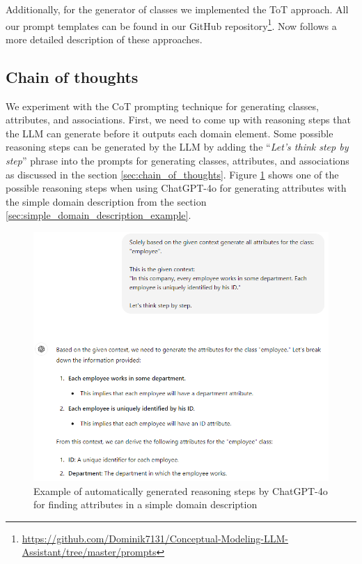 \noindent{}Additionally, for the generator of classes we implemented the ToT approach. All our prompt templates can be found in our GitHub repository\footnote{\url{https://github.com/Dominik7131/Conceptual-Modeling-LLM-Assistant/tree/master/prompts}}. Now follows a more detailed description of these approaches.



\subsection{Chain of thoughts}

We experiment with the CoT prompting technique for generating classes, attributes, and associations. First, we need to come up with reasoning steps that the LLM can generate before it outputs each domain element. Some possible reasoning steps can be generated by the LLM by adding the ``\textit{Let's think step by step}'' phrase into the prompts for generating classes, attributes, and associations as discussed in the section \ref{sec:chain_of_thoughts}. Figure \ref{fig:cot-think-step-by-step} shows one of the possible reasoning steps when using ChatGPT-4o for generating attributes with the simple domain description from the section \ref{sec:simple_domain_description_example}.

\begin{figure}[!h]
    \centering
    \includegraphics[scale=0.6]{img/cot-think-step-by-step.png}
    \caption{\centering Example of automatically generated reasoning steps by ChatGPT-4o for finding attributes in a simple domain description}
    \label{fig:cot-think-step-by-step}
\end{figure}


